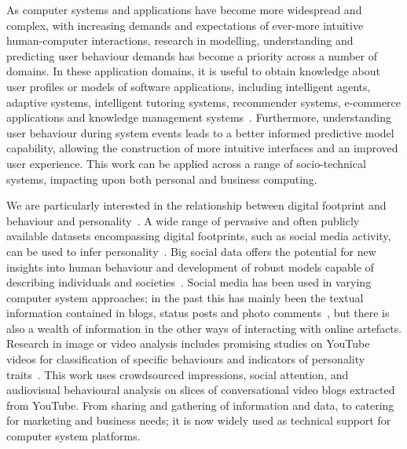 \documentclass[graybox]{svmult}
\begin{document}
As computer systems and applications have become more widespread and
complex, with increasing demands and expectations of ever-more
intuitive human-computer interactions, research in modelling,
understanding and predicting user behaviour demands has become a
priority across a number of domains.  In these application domains, it
is useful to obtain knowledge about user profiles or models of
software applications, including intelligent agents, adaptive systems,
intelligent tutoring systems, recommender systems, e-commerce
applications and knowledge management
systems~\cite{schiaffino+amandi:2009}. Furthermore, understanding user
behaviour during system events leads to a better informed predictive
model capability, allowing the construction of more intuitive
interfaces and an improved user experience. This work can be applied
across a range of socio-technical systems, impacting upon both
personal and business computing.

We are particularly interested in the relationship between digital
footprint and behaviour and
personality~\citep{oatley+crick:2014,oatley-et-al_dasc2015,blamey-et-al-2012,blamey-et-al-2013}.
A wide range of pervasive and often publicly available datasets
encompassing digital footprints, such as social media activity, can be
used to infer
personality~\citep{lambiotte+kosinski:2014,oatley-et-al-soccogcomp2015}.
Big social data offers the potential for new insights into human
behaviour and development of robust models capable of describing
individuals and societies~\citep{lazer-et-al:2009}. Social media has
been used in varying computer system approaches; in the past this has
mainly been the textual information contained in blogs, status posts
and photo comments~\cite{blamey-et-al-2012,blamey-et-al-2013}, but
there is also a wealth of information in the other ways of interacting
with online artefacts. Research in image or video analysis includes
promising studies on YouTube videos for classification of specific
behaviours and indicators of personality
traits~\citep{biel+gatica-perez:2012}. This work uses crowdsourced
impressions, social attention, and audiovisual behavioural analysis on
slices of conversational video blogs extracted from YouTube. From
sharing and gathering of information and data, to catering for
marketing and business needs; it is now widely used as technical
support for computer system platforms.

\end{document}
